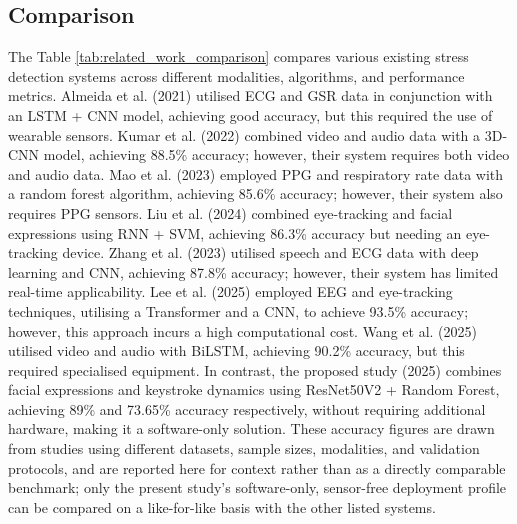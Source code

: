 \documentclass[fleqn,10pt]{wlscirep}
\begin{document}
\subsection*{Comparison}
The Table \ref{tab:related_work_comparison} compares various existing stress detection systems across different modalities, algorithms, and performance metrics. Almeida et al. (2021) utilised ECG and GSR data in conjunction with an LSTM + CNN model, achieving good accuracy, but this required the use of wearable sensors. Kumar et al. (2022) combined video and audio data with a 3D-CNN model, achieving 88.5\% accuracy; however, their system requires both video and audio data. Mao et al. (2023) employed PPG and respiratory rate data with a random forest algorithm, achieving 85.6\% accuracy; however, their system also requires PPG sensors. Liu et al. (2024) combined eye-tracking and facial expressions using RNN + SVM, achieving 86.3\% accuracy but needing an eye-tracking device. Zhang et al. (2023) utilised speech and ECG data with deep learning and CNN, achieving 87.8\% accuracy; however, their system has limited real-time applicability. Lee et al. (2025) employed EEG and eye-tracking techniques, utilising a Transformer and a CNN, to achieve 93.5\% accuracy; however, this approach incurs a high computational cost. Wang et al. (2025) utilised video and audio with BiLSTM, achieving 90.2\% accuracy, but this required specialised equipment. In contrast, the proposed study (2025) combines facial expressions and keystroke dynamics using ResNet50V2 + Random Forest, achieving 89\% and 73.65\% accuracy respectively, without requiring additional hardware, making it a software-only solution. These accuracy figures are drawn from studies using different datasets, sample sizes, modalities, and validation protocols, and are reported here for context rather than as a directly comparable benchmark; only the present study's software-only, sensor-free deployment profile can be compared on a like-for-like basis with the other listed systems.
\end{document}
